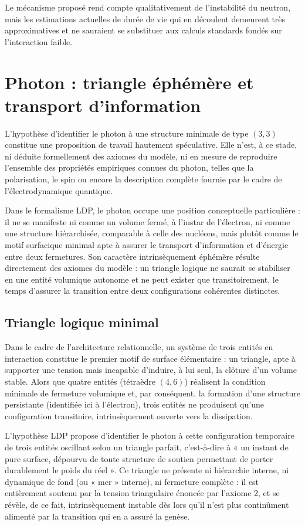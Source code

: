 \documentclass[11pt,a4paper]{article}
\begin{document}
Le mécanisme proposé rend compte qualitativement de l’instabilité du neutron, mais les estimations actuelles de durée de vie qui en découlent demeurent très approximatives et ne sauraient se substituer aux calculs standards fondés sur l’interaction faible.

\section{Photon : triangle éphémère et transport d’information}

L’hypothèse d’identifier le photon à une structure minimale de type \(\left(3,3\right)\) constitue une proposition de travail hautement spéculative. Elle n’est, à ce stade, ni déduite formellement des axiomes du modèle, ni en mesure de reproduire l’ensemble des propriétés empiriques connues du photon, telles que la polarisation, le spin ou encore la description complète fournie par le cadre de l’électrodynamique quantique.

Dans le formalisme LDP, le photon occupe une position conceptuelle particulière : il ne se manifeste ni comme un volume fermé, à l’instar de l’électron, ni comme une structure hiérarchisée, comparable à celle des nucléons, mais plutôt comme le motif surfacique minimal apte à assurer le transport d’information et d’énergie entre deux fermetures. Son caractère intrinsèquement éphémère résulte directement des axiomes du modèle : un triangle logique ne saurait se stabiliser en une entité volumique autonome et ne peut exister que transitoirement, le temps d’assurer la transition entre deux configurations cohérentes distinctes.

\subsection{Triangle logique minimal}

Dans le cadre de l’architecture relationnelle, un système de trois entités en interaction constitue le premier motif de surface élémentaire : un triangle, apte à supporter une tension mais incapable d’induire, à lui seul, la clôture d’un volume stable. Alors que quatre entités (tétraèdre \(\left(4,6\right)\)) réalisent la condition minimale de fermeture volumique et, par conséquent, la formation d’une structure persistante (identifiée ici à l’électron), trois entités ne produisent qu’une configuration transitoire, intrinsèquement ouverte vers la dissipation.

L’hypothèse LDP propose d’identifier le photon à cette configuration temporaire de trois entités oscillant selon un triangle parfait, c’est-à-dire à « un instant de pure surface, dépourvu de toute structure de soutien permettant de porter durablement le poids du réel ». Ce triangle ne présente ni hiérarchie interne, ni dynamique de fond (ou « mer » interne), ni fermeture complète : il est entièrement soutenu par la tension triangulaire énoncée par l’axiome 2, et se révèle, de ce fait, intrinsèquement instable dès lors qu’il n’est plus continûment alimenté par la transition qui en a assuré la genèse.
\end{document}
